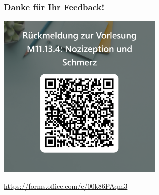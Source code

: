 \documentclass{beamer}
\begin{document}

\begin{frame}
\frametitle{Danke für Ihr Feedback!}

\begin{center}
    \includegraphics[width=0.6\textwidth]{feedback_QR.png}
\end{center}


\url{https://forms.office.com/e/00k86PAqm3}

\end{frame}
\end{document}
